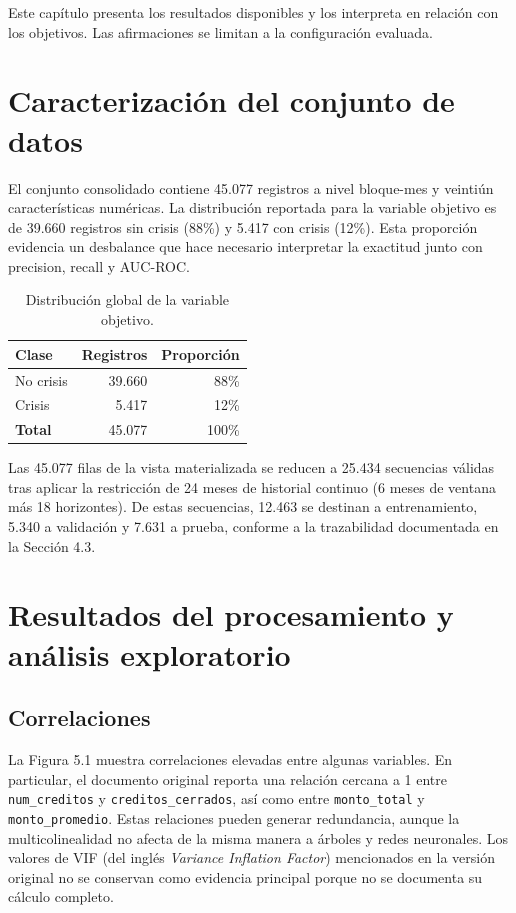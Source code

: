 Este capítulo presenta los resultados disponibles y los interpreta en relación con los objetivos. Las afirmaciones se limitan a la configuración evaluada.

\section{Caracterización del conjunto de datos}

El conjunto consolidado contiene 45.077 registros a nivel bloque-mes y veintiún características numéricas. La distribución reportada para la variable objetivo es de 39.660 registros sin crisis (88\%) y 5.417 con crisis (12\%). Esta proporción evidencia un desbalance que hace necesario interpretar la exactitud junto con precision, recall y AUC-ROC.

\begin{table}[H]
    \centering
    \begin{tabular}{|l|r|r|}
    \hline
        \textbf{Clase} & \textbf{Registros} & \textbf{Proporción} \\
    \hline
        No crisis & 39.660 & 88\% \\
    \hline
        Crisis & 5.417 & 12\% \\
    \hline
        \textbf{Total} & 45.077 & 100\% \\
    \hline
    \end{tabular}
    \caption{Distribución global de la variable objetivo.}
    \label{tab:dist_objetivo}
    \end{table}

Las 45.077 filas de la vista materializada se reducen a 25.434 secuencias válidas tras aplicar la restricción de 24 meses de historial continuo (6 meses de ventana más 18 horizontes). De estas secuencias, 12.463 se destinan a entrenamiento, 5.340 a validación y 7.631 a prueba, conforme a la trazabilidad documentada en la Sección 4.3.

\section{Resultados del procesamiento y \newline análisis exploratorio}

\subsection{Correlaciones}

La Figura 5.1 muestra correlaciones elevadas entre algunas variables. En particular, el documento original reporta una relación cercana a 1 entre \texttt{num\_creditos} y \texttt{creditos\_cerrados}, así como entre \texttt{monto\_total} y \texttt{monto\_promedio}. Estas relaciones pueden generar redundancia, aunque la multicolinealidad no afecta de la misma manera a árboles y redes neuronales. Los valores de VIF (del inglés \textit{Variance Inflation Factor}) mencionados en la versión original no se conservan como evidencia principal porque no se documenta su cálculo completo.

